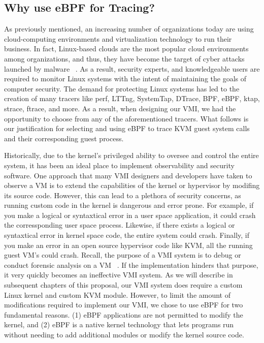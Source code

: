 \documentclass{report}
\begin{document}
\begin{spacing}{1.5}
\subsection{Why use eBPF for Tracing?}

{\large
As previously mentioned, an increasing number of organizations today are using cloud-computing environments and virtualization technology to run their business. In fact, Linux-based clouds are the most popular cloud environments among organizations, and thus, they have become the target of cyber attacks launched by malware ~\cite{panker2021leveraging}. As a result, security experts, and knowledgeable users are required to monitor Linux systems with the intent of maintaining the goals of computer security. The demand for protecting Linux systems has led to the creation of many tracers like perf, LTTng, SystemTap, DTrace, BPF, eBPF, ktap, strace, ftrace, and more. As a result, when designing our VMI, we had the opportunity to choose from any of the aforementioned tracers. What follows is our justification for selecting and using eBPF to trace KVM guest system calls and their corresponding guest process.
\newline
}

{\large
\noindent Historically, due to the kernel’s privileged ability to oversee and control the entire system, it has been an ideal place to implement observability and security software. One approach that many VMI designers and developers have taken to observe a VM is to extend the capabilities of the kernel or hypervisor by modifing its source code. However, this can lead to a plethora of security concerns, as running custom code in the kernel is dangerous and error prone. For example, if you make a logical or syntaxtical error in a user space application, it could crash the corressponding user space process. Likewise, if there exists a logical or syntaxtical error in kernel space code, the entire system could crash. Finally, if you make an error in an open source hypervisor code like KVM, all the running guest VM's could crash. Recall, the purpose of a VMI system is to debug or conduct forensic analysis on a VM ~\cite{Payne2011}. If the implementation hinders that purpose, it very quickly becomes an ineffective VMI system. As we will describe in subsequent chapters of this proposal, our VMI system does require a custom Linux kernel and custom KVM module. However, to limit the amount of modifications required to implement our VMI, we chose to use eBPF for two fundamental reasons. (1) eBPF applications are not permitted to modify the kernel, and (2) eBPF is a native kernel technology that lets programs run without needing to add additional modules or modify the kernel source code.
\newline
}


\end{spacing}
\end{document}
